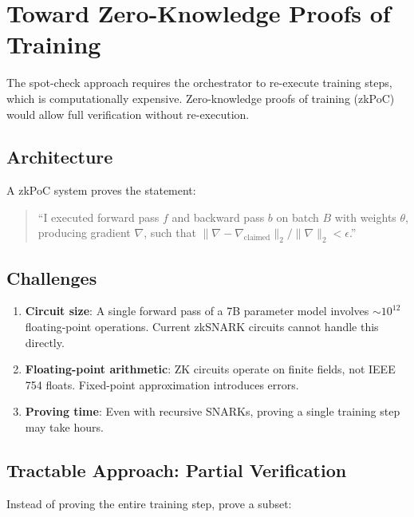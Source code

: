 \documentclass[11pt,letterpaper]{article}
\begin{document}
\section{Toward Zero-Knowledge Proofs of Training}
\label{sec:zkpoc}

The spot-check approach requires the orchestrator to re-execute training steps, which is computationally expensive.  Zero-knowledge proofs of training (zkPoC) would allow full verification without re-execution.

\subsection{Architecture}

A zkPoC system proves the statement:

\begin{quote}
``I executed forward pass $f$ and backward pass $b$ on batch $B$ with weights $\theta$, producing gradient $\nabla$, such that $\|\nabla - \nabla_{\text{claimed}}\|_2 / \|\nabla\|_2 < \epsilon$.''
\end{quote}

\subsection{Challenges}

\begin{enumerate}
    \item \textbf{Circuit size}: A single forward pass of a 7B parameter model involves $\sim10^{12}$ floating-point operations.  Current zkSNARK circuits cannot handle this directly.
    \item \textbf{Floating-point arithmetic}: ZK circuits operate on finite fields, not IEEE 754 floats.  Fixed-point approximation introduces errors.
    \item \textbf{Proving time}: Even with recursive SNARKs, proving a single training step may take hours.
\end{enumerate}

\subsection{Tractable Approach: Partial Verification}

Instead of proving the entire training step, prove a subset:
\end{document}
